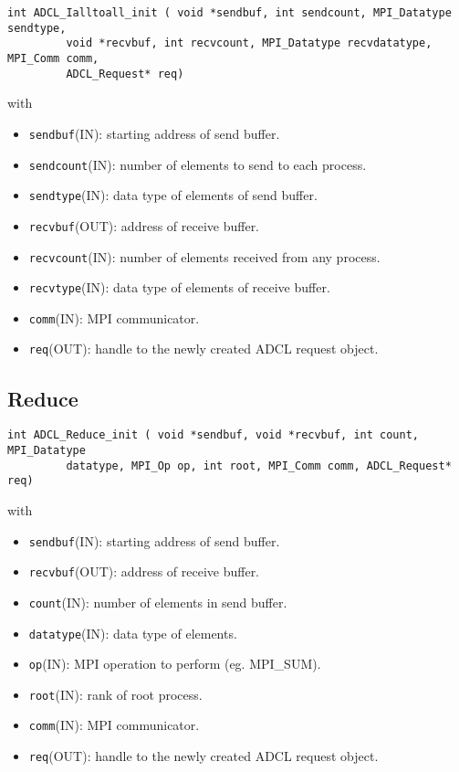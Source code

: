 \begin{verbatim}
int ADCL_Ialltoall_init ( void *sendbuf, int sendcount, MPI_Datatype sendtype,
         void *recvbuf, int recvcount, MPI_Datatype recvdatatype, MPI_Comm comm,
         ADCL_Request* req)
\end{verbatim}
with
\begin{itemize}
\item {\tt sendbuf}(IN): starting address of send buffer.
\item {\tt sendcount}(IN): number of elements to send to each process.
\item {\tt sendtype}(IN): data type of elements of send buffer.
\item {\tt recvbuf}(OUT): address of receive buffer.
\item {\tt recvcount}(IN): number of elements received from any process.
\item {\tt recvtype}(IN): data type of elements of receive buffer.
\item {\tt comm}(IN): MPI communicator.
\item {\tt req}(OUT): handle to the newly created ADCL request object.
\end{itemize}

\subsection{Reduce}

\begin{verbatim}
int ADCL_Reduce_init ( void *sendbuf, void *recvbuf, int count, MPI_Datatype
         datatype, MPI_Op op, int root, MPI_Comm comm, ADCL_Request* req)
\end{verbatim}
with
\begin{itemize}
\item {\tt sendbuf}(IN): starting address of send buffer.
\item {\tt recvbuf}(OUT): address of receive buffer.
\item {\tt count}(IN): number of elements in send buffer.
\item {\tt datatype}(IN): data type of elements.
\item {\tt op}(IN): MPI operation to perform (eg. MPI_SUM).
\item {\tt root}(IN): rank of root process.
\item {\tt comm}(IN): MPI communicator.
\item {\tt req}(OUT): handle to the newly created ADCL request object.
\end{itemize}


